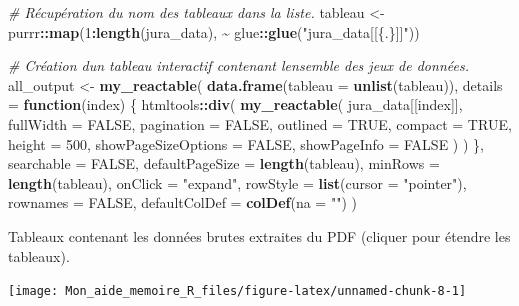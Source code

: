 \documentclass[
  french,
]{book}
\newenvironment{Shaded}{\begin{snugshade}}{\end{snugshade}}
\newcommand{\CommentTok}[1]{\textcolor[rgb]{0.56,0.35,0.01}{\textit{#1}}}
\newcommand{\ControlFlowTok}[1]{\textcolor[rgb]{0.13,0.29,0.53}{\textbf{#1}}}
\newcommand{\DataTypeTok}[1]{\textcolor[rgb]{0.13,0.29,0.53}{#1}}
\newcommand{\DecValTok}[1]{\textcolor[rgb]{0.00,0.00,0.81}{#1}}
\newcommand{\KeywordTok}[1]{\textcolor[rgb]{0.13,0.29,0.53}{\textbf{#1}}}
\newcommand{\NormalTok}[1]{#1}
\newcommand{\OperatorTok}[1]{\textcolor[rgb]{0.81,0.36,0.00}{\textbf{#1}}}
\newcommand{\OtherTok}[1]{\textcolor[rgb]{0.56,0.35,0.01}{#1}}
\newcommand{\StringTok}[1]{\textcolor[rgb]{0.31,0.60,0.02}{#1}}
\begin{document}
\begin{Shaded}
\begin{Highlighting}[]
\CommentTok{\# Récupération du nom des tableaux dans la liste.}
\NormalTok{tableau \textless{}{-}}\StringTok{ }\NormalTok{purrr}\OperatorTok{::}\KeywordTok{map}\NormalTok{(}\DecValTok{1}\OperatorTok{:}\KeywordTok{length}\NormalTok{(jura\_data), }\OperatorTok{\textasciitilde{}}\StringTok{ }\NormalTok{glue}\OperatorTok{::}\KeywordTok{glue}\NormalTok{(}\StringTok{"jura\_data[[\{.\}]]"}\NormalTok{))}

\CommentTok{\# Création d\textquotesingle{}un tableau interactif contenant l\textquotesingle{}ensemble des jeux de données.}
\NormalTok{all\_output \textless{}{-}}\StringTok{ }\KeywordTok{my\_reactable}\NormalTok{(}
  \KeywordTok{data.frame}\NormalTok{(}\DataTypeTok{tableau =} \KeywordTok{unlist}\NormalTok{(tableau)),}
  \DataTypeTok{details =} \ControlFlowTok{function}\NormalTok{(index) \{}
\NormalTok{    htmltools}\OperatorTok{::}\KeywordTok{div}\NormalTok{(}
        \KeywordTok{my\_reactable}\NormalTok{(}
\NormalTok{          jura\_data[[index]],}
          \DataTypeTok{fullWidth =} \OtherTok{FALSE}\NormalTok{,}
          \DataTypeTok{pagination =} \OtherTok{FALSE}\NormalTok{,}
          \DataTypeTok{outlined =} \OtherTok{TRUE}\NormalTok{,}
          \DataTypeTok{compact =} \OtherTok{TRUE}\NormalTok{,}
          \DataTypeTok{height =} \DecValTok{500}\NormalTok{,}
          \DataTypeTok{showPageSizeOptions =} \OtherTok{FALSE}\NormalTok{,}
          \DataTypeTok{showPageInfo =} \OtherTok{FALSE}
\NormalTok{        )}
\NormalTok{    )}
\NormalTok{  \},}
  \DataTypeTok{searchable =} \OtherTok{FALSE}\NormalTok{,}
  \DataTypeTok{defaultPageSize =} \KeywordTok{length}\NormalTok{(tableau), }
  \DataTypeTok{minRows =} \KeywordTok{length}\NormalTok{(tableau),}
  \DataTypeTok{onClick =} \StringTok{"expand"}\NormalTok{,}
  \DataTypeTok{rowStyle =} \KeywordTok{list}\NormalTok{(}\DataTypeTok{cursor =} \StringTok{"pointer"}\NormalTok{),}
  \DataTypeTok{rownames =} \OtherTok{FALSE}\NormalTok{,}
  \DataTypeTok{defaultColDef =} \KeywordTok{colDef}\NormalTok{(}\DataTypeTok{na =} \StringTok{""}\NormalTok{)}
\NormalTok{)}
\end{Highlighting}
\end{Shaded}

\label{tab:juradata} Tableaux contenant les données brutes extraites du PDF (cliquer pour étendre les tableaux).

\begin{center}\texttt{[image: Mon\_aide\_memoire\_R\_files/figure-latex/unnamed-chunk-8-1]} \end{center}
\end{document}
